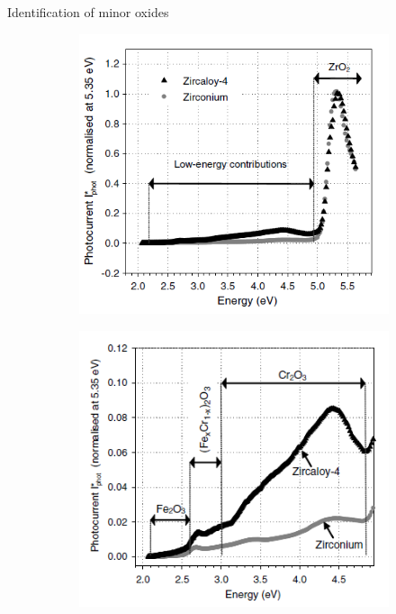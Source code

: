 \documentclass[10pt,compress]{beamer}
\begin{document}
\begin{frame}[allowframebreaks=1.0]{Identification of minor oxides}
    \newcommand{\coef}{0.45}
    \begin{figure}[h]
        \centering
        \begin{subfigure}{\coef\textwidth}
            \centering
            \includegraphics[width=\textwidth]{./src/figures/Benaboud2007-Fig4.png}
            \caption{}
            \label{fig_benaboud_minor_oxides_a}
        \end{subfigure}
        \begin{subfigure}{\coef\textwidth}
            \centering
            \includegraphics[width=\textwidth]{./src/figures/Benaboud2007-Fig5.png}
            \caption{}
            \label{fig_benaboud_minor_oxides_b}
        \end{subfigure}
        

\end{figure}
\end{frame}
\end{document}
